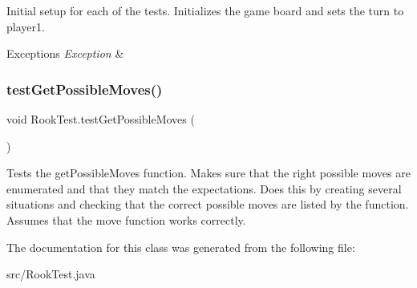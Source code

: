 Initial setup for each of the tests. Initializes the game board and sets the turn to player1. 
\begin{DoxyExceptions}{Exceptions}
{\em Exception} & \\
\hline
\end{DoxyExceptions}
\mbox{\label{class_rook_test_ab9a2a72da4718bb50f0b57d95862afbc}} 
\subsubsection{\texorpdfstring{test\+Get\+Possible\+Moves()}{testGetPossibleMoves()}}
{\footnotesize\ttfamily void Rook\+Test.\+test\+Get\+Possible\+Moves (\begin{DoxyParamCaption}{ }\end{DoxyParamCaption})}

Tests the get\+Possible\+Moves function. Makes sure that the right possible moves are enumerated and that they match the expectations. Does this by creating several situations and checking that the correct possible moves are listed by the function. Assumes that the move function works correctly. 

The documentation for this class was generated from the following file\+:\begin{DoxyCompactItemize}
\item 
src/Rook\+Test.\+java\end{DoxyCompactItemize}

